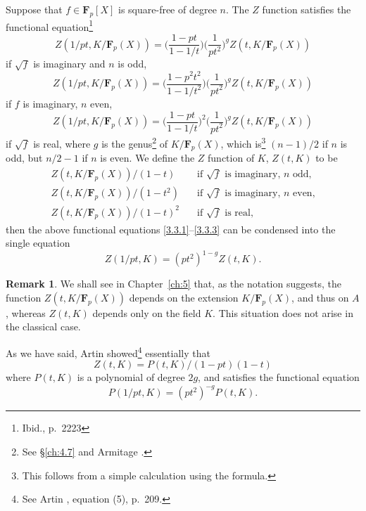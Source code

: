 \documentclass[10pt]{article}
\theoremstyle{definition}
\newtheorem{rema}[theo]{Remark}
\def\FF{\mathbf{F}}
\def\fntwni{Ibid., p.~2223}
\def\fnthze{See \S\ref{ch:4.7} and Armitage \cite{bib:5}.}
\def\fnthon{This follows from a simple calculation using the formula.}
\def\fnthtw{See Artin \cite{bib:6}, equation (5), p.~209.}
\begin{document}
Suppose that $f \in \FF_p[X]$ is square-free of degree $n$.
The $Z$ function satisfies the functional equation\footnote{\fntwni}
\begin{equation}
\label{3.3.1}
Z(1/pt, K/\FF_p(X))
= \biggl(
\frac{1-pt}{1-1/t}
\biggr)
\biggl(
\frac{1}{pt^2}
\biggr)^g
Z(t, K/\FF_p(X))
\end{equation}
if $\sqrt f$ is imaginary and $n$ is odd,
\begin{equation}
\label{3.3.2}
Z(1/pt, K/\FF_p(X))
= \biggl(
\frac{1-p^2t^2}{1-1/t^2}
\biggr)
\biggl(
\frac{1}{pt^2}
\biggr)^g
Z(t, K/\FF_p(X))
\end{equation}
if $f$ is imaginary, $n$ even,
\begin{equation}
\label{3.3.3}
Z(1/pt, K/\FF_p(X))
= \biggl(
\frac{1-pt}{1-1/t}
\biggr)^2
\biggl(
\frac{1}{pt^2}
\biggr)^g
Z(t, K/\FF_p(X))
\end{equation}
if $\sqrt f$ is real, where $g$ is the genus\footnote{\fnthze} of $K/\FF_p(X)$, which is\footnote{\fnthon} $(n-1)/2$ if $n$ is odd, but $n/2 - 1$ if $n$ is even.
We define the $Z$ function of $K$, $Z(t,K)$ to be
\begin{equation}
\label{3.3.4}
\begin{aligned}
Z(t,K/\FF_p(X)) / (1-t) & \quad \text{if $\sqrt f$ is imaginary, $n$ odd,}
\\
Z(t,K/\FF_p(X)) / (1-t^2) & \quad \text{if $\sqrt f$ is imaginary, $n$ even,}
\\
Z(t,K/\FF_p(X)) / (1-t)^2 & \quad \text{if $\sqrt f$ is real,}
\end{aligned}
\end{equation}
then the above functional equations \eqref{3.3.1}--\eqref{3.3.3} can be condensed into the single equation
\begin{equation}
\label{3.3.5}
Z(1/pt,K) = (pt^2)^{1-g} Z(t,K).
\end{equation}


\begin{rema}
We shall see in Chapter~\ref{ch:5} that, as the notation suggests, 
the function
$Z(t, K/\FF_p(X))$ depends on the extension $K/\FF_p(X)$, and thus on $A$, whereas $Z(t,K)$ depends only on the field $K$.
This situation does not arise in the classical case.
\end{rema}

As we have said, Artin showed\footnote{\fnthtw} essentially that
\begin{equation}
\label{3.3.7}
Z(t,K) = P(t,K)/(1-pt)(1-t)
\end{equation}
where $P(t,K)$ is a polynomial of degree $2g$, and satisfies the functional equation
\begin{equation}
\label{3.3.8}
P(1/pt, K) = (pt^2)^{-g} P(t,K).
\end{equation}
\end{document}
